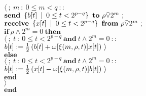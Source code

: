 \begin{tabbing}
		\>$\langle \ ;\ m\ :\ 0\leq m<q\ ::$\\
			\>\>$\mathbf{send}\ \left\{ b[t] \enspace \middle\vert \enspace 0\leq t<2^{p-q} \right\}\ \mathbf{to}\ \rho\bar{\vee}2^m\ ;$\\
			\>\>$\mathbf{receive}\ \left\{ x[t] \enspace \middle\vert \enspace 0\leq t<2^{p-q} \right\}\ \mathbf{from}\ \rho\bar{\vee}2^m\ ;$\\
			\>\>$\mathbf{if}\ \rho\wedge 2^m=0\ \mathbf{then}$\\
				\>\>\>$\langle \ ;\ t\ :\ 0\leq t<2^{p-q}\ \mathbf{and}\ t\wedge 2^m=0\ ::$\\
					\>\>\>\>$b[t]:=\frac{1}{2}\left( b[t] + \omega[\xi(m,\rho, t)]x[t] \right)\ \rangle$\\
			\>\>$\mathbf{else}$\\
				\>\>\>$\langle \ ;\ t\ :\ 0\leq t<2^{p-q}\ \mathbf{and}\ t\wedge 2^m=0\ ::$\\
					\>\>\>\>$b[t]:=\frac{1}{2}\left( x[t] - \omega[\xi(m,\rho, t)]b[t] \right)\ \rangle$\\
			\>\>$\mathbf{end}$\\
		\>$\rangle$\\
	$\mathbf{end}$\\
\end{tabbing}